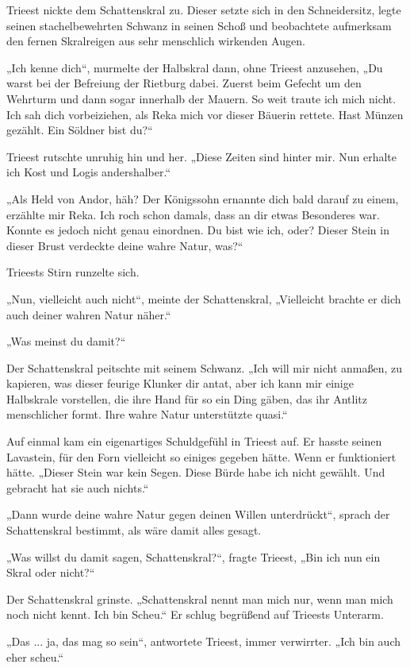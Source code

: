 Trieest nickte dem Schattenskral zu. Dieser setzte sich in den Schneidersitz, legte seinen stachelbewehrten Schwanz in seinen Schoß und beobachtete aufmerksam den fernen Skralreigen aus sehr menschlich wirkenden Augen.

„Ich kenne dich“, murmelte der Halbskral dann, ohne Trieest anzusehen, „Du warst bei der Befreiung der Rietburg dabei. Zuerst beim Gefecht um den Wehrturm und dann sogar innerhalb der Mauern. So weit traute ich mich nicht. Ich sah dich vorbeiziehen, als Reka mich vor dieser Bäuerin rettete. Hast Münzen gezählt. Ein Söldner bist du?“

Trieest rutschte unruhig hin und her. „Diese Zeiten sind hinter mir. Nun erhalte ich Kost und Logis andershalber.“

„Als Held von Andor, häh? Der Königssohn ernannte dich bald darauf zu einem, erzählte mir Reka. Ich roch schon damals, dass an dir etwas Besonderes war. Konnte es jedoch nicht genau einordnen. Du bist wie ich, oder? Dieser Stein in dieser Brust verdeckte deine wahre Natur, was?“

Trieests Stirn runzelte sich.

„Nun, vielleicht auch nicht“, meinte der Schattenskral, „Vielleicht brachte er dich auch deiner wahren Natur näher.“

„Was meinst du damit?“

Der Schattenskral peitschte mit seinem Schwanz. „Ich will mir nicht anmaßen, zu kapieren, was dieser feurige Klunker dir antat, aber ich kann mir einige Halbskrale vorstellen, die ihre Hand für so ein Ding gäben, das ihr Antlitz menschlicher formt. Ihre wahre Natur unterstützte quasi.“

Auf einmal kam ein eigenartiges Schuldgefühl in Trieest auf. Er hasste seinen Lavastein, für den Forn vielleicht so einiges gegeben hätte. Wenn er funktioniert hätte. „Dieser Stein war kein Segen. Diese Bürde habe ich nicht gewählt. Und gebracht hat sie auch nichts.“

„Dann wurde deine wahre Natur gegen deinen Willen unterdrückt“, sprach der Schattenskral bestimmt, als wäre damit alles gesagt.

„Was willst du damit sagen, Schattenskral?“, fragte Trieest, „Bin ich nun ein Skral oder nicht?“

Der Schattenskral grinste. „Schattenskral nennt man mich nur, wenn man mich noch nicht kennt. Ich bin Scheu.“ Er schlug begrüßend auf Trieests Unterarm.

„Das ... ja, das mag so sein“, antwortete Trieest, immer verwirrter. „Ich bin auch eher scheu.“

